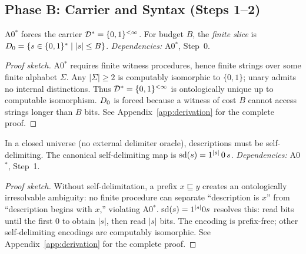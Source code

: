 

\subsection{Phase B: Carrier and Syntax (Steps 1--2)}
\label{sec:derivation:carrier}

\begin{theorem}
\label{thm:carrier}
A0$^*$ forces the carrier $\mathcal{D}^* = \{0,1\}^{<\infty}$.  For budget $B$, the \emph{finite slice} is
$D_0 = \{ s \in \{0,1\}^* \mid |s| \leq B \}$.
\emph{Dependencies:} A0$^*$, Step~0.
\begin{proof}[Proof sketch]
A0$^*$ requires finite witness procedures, hence finite strings over some finite alphabet $\Sigma$.  Any $|\Sigma| \geq 2$ is computably isomorphic to $\{0,1\}$; unary admits no internal distinctions.  Thus $\mathcal{D}^* = \{0,1\}^{<\infty}$ is ontologically unique up to computable isomorphism.  $D_0$ is forced because a witness of cost $B$ cannot access strings longer than $B$ bits.
See Appendix~\ref{app:derivation} for the complete proof.
\end{proof}
\end{theorem}

\begin{theorem}
\label{thm:sd}
In a closed universe (no external delimiter oracle), descriptions must be self-delimiting.  The canonical self-delimiting map is
$\mathrm{sd}(s) = 1^{|s|} \, 0 \, s$.
\emph{Dependencies:} A0$^*$, Step~1.
\begin{proof}[Proof sketch]
Without self-delimitation, a prefix $x \sqsubseteq y$ creates an ontologically irresolvable ambiguity: no finite procedure can separate ``description is $x$'' from ``description begins with $x$,'' violating A0$^*$.  $\mathrm{sd}(s) = 1^{|s|}0s$ resolves this: read bits until the first $0$ to obtain $|s|$, then read $|s|$ bits.  The encoding is prefix-free; other self-delimiting encodings are computably isomorphic.
See Appendix~\ref{app:derivation} for the complete proof.
\end{proof}
\end{theorem}

